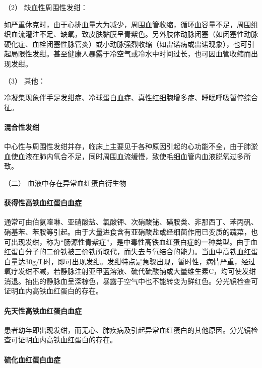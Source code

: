 \hypertarget{text00041.htmlux5cux23CHP1-17-1-1-2-2}{}
（2） 缺血性周围性发绀：

如严重休克时，由于心排血量大为减少，周围血管收缩，循环血容量不足，周围组织血流灌注不足、缺氧，致皮肤黏膜呈青紫色。另外肢体动脉闭塞（如闭塞性动脉硬化症、血栓闭塞性脉管炎）或小动脉强烈收缩（如雷诺病或雷诺现象），也可引起局限性发绀。甚至健康人暴露于冷空气或冷水中时间过长，也可因血管收缩而出现发绀。

\hypertarget{text00041.htmlux5cux23CHP1-17-1-1-2-3}{}
（3） 其他：

冷凝集现象伴手足发绀症、冷球蛋白血症、真性红细胞增多症、睡眠呼吸暂停综合征。

\paragraph{混合性发绀}

中心性与周围性发绀并存，临床上主要见于各种原因引起的心功能不全，由于肺淤血使血液在肺内氧合不足，同时周围血流缓慢，致使毛细血管内血液脱氧过多所致。

\hypertarget{text00041.htmlux5cux23CHP1-17-1-2}{}
（二） 血液中存在异常血红蛋白衍生物

\paragraph{获得性高铁血红蛋白血症}

通常可由伯氨喹啉、亚硝酸盐、氯酸钾、次硝酸铋、磺胺类、非那西丁、苯丙矾、硝基苯、苯胺等引起。由于大量进食含有亚硝酸盐或经细菌作用已变质的蔬菜，也可出现发绀，称为“肠源性青紫症”，是中毒性高铁血红蛋白症的一种类型。由于血红蛋白分子的二价铁被三价铁所取代，而失去与氧结合的能力。当血中高铁血红蛋白量达30g/L时，即可出现发绀。发绀特点是急骤出现，暂时性，病情严重，经过氧疗发绀不减，若静脉注射亚甲蓝溶液、硫代硫酸钠或大量维生素C，均可使发绀消退。抽出的静脉血呈深棕色，暴露于空气中也不能转变为鲜红色。分光镜检查可证明血内高铁血红蛋白的存在。

\paragraph{先天性高铁血红蛋白血症}

患者幼年即出现发绀，而无心、肺疾病及引起异常血红蛋白的其他原因。分光镜检查可证明血内高铁血红蛋白的存在。

\paragraph{硫化血红蛋白血症}

